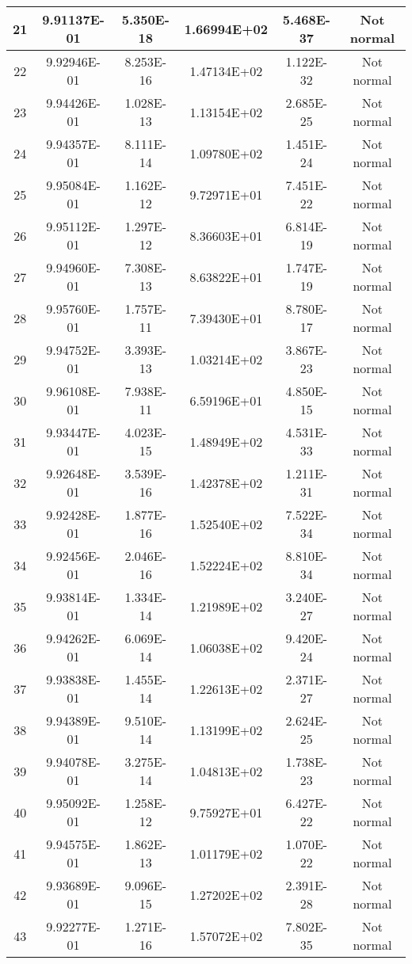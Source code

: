 \begin{table}[h]
\begin{tabular}{|c|c|c|c|c|c|}
		21 & 9.91137E-01 & 5.350E-18 & 1.66994E+02 & 5.468E-37 & Not normal\\\hline
		22 & 9.92946E-01 & 8.253E-16 & 1.47134E+02 & 1.122E-32 & Not normal\\\hline
		23 & 9.94426E-01 & 1.028E-13 & 1.13154E+02 & 2.685E-25 & Not normal\\\hline
		24 & 9.94357E-01 & 8.111E-14 & 1.09780E+02 & 1.451E-24 & Not normal\\\hline
		25 & 9.95084E-01 & 1.162E-12 & 9.72971E+01 & 7.451E-22 & Not normal\\\hline
		26 & 9.95112E-01 & 1.297E-12 & 8.36603E+01 & 6.814E-19 & Not normal\\\hline
		27 & 9.94960E-01 & 7.308E-13 & 8.63822E+01 & 1.747E-19 & Not normal\\\hline
		28 & 9.95760E-01 & 1.757E-11 & 7.39430E+01 & 8.780E-17 & Not normal\\\hline
		29 & 9.94752E-01 & 3.393E-13 & 1.03214E+02 & 3.867E-23 & Not normal\\\hline
		30 & 9.96108E-01 & 7.938E-11 & 6.59196E+01 & 4.850E-15 & Not normal\\\hline
		31 & 9.93447E-01 & 4.023E-15 & 1.48949E+02 & 4.531E-33 & Not normal\\\hline
		32 & 9.92648E-01 & 3.539E-16 & 1.42378E+02 & 1.211E-31 & Not normal\\\hline
		33 & 9.92428E-01 & 1.877E-16 & 1.52540E+02 & 7.522E-34 & Not normal\\\hline
		34 & 9.92456E-01 & 2.046E-16 & 1.52224E+02 & 8.810E-34 & Not normal\\\hline
		35 & 9.93814E-01 & 1.334E-14 & 1.21989E+02 & 3.240E-27 & Not normal\\\hline
		36 & 9.94262E-01 & 6.069E-14 & 1.06038E+02 & 9.420E-24 & Not normal\\\hline
		37 & 9.93838E-01 & 1.455E-14 & 1.22613E+02 & 2.371E-27 & Not normal\\\hline
		38 & 9.94389E-01 & 9.510E-14 & 1.13199E+02 & 2.624E-25 & Not normal\\\hline
		39 & 9.94078E-01 & 3.275E-14 & 1.04813E+02 & 1.738E-23 & Not normal\\\hline
		40 & 9.95092E-01 & 1.258E-12 & 9.75927E+01 & 6.427E-22 & Not normal\\\hline
		41 & 9.94575E-01 & 1.862E-13 & 1.01179E+02 & 1.070E-22 & Not normal\\\hline
		42 & 9.93689E-01 & 9.096E-15 & 1.27202E+02 & 2.391E-28 & Not normal\\\hline
		43 & 9.92277E-01 & 1.271E-16 & 1.57072E+02 & 7.802E-35 & Not normal\\\hline

\end{tabular}
\end{table}

